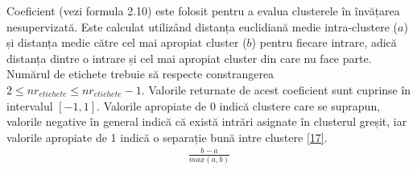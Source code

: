 Coeficient (vezi formula 2.10) este folosit pentru a evalua clusterele în învățarea nesupervizată. Este calculat utilizând distanța euclidiană medie intra-clustere ($a$) și distanța medie către cel mai apropiat cluster ($b$) pentru fiecare intrare, adică distanța dintre o intrare și cel mai apropiat cluster din care nu face parte. Numărul de etichete trebuie să respecte constrangerea $2 \leq nr_{etichete} \leq nr_{etichete} - 1$. Valorile returnate de acest coeficient sunt cuprinse în intervalul $[-1, 1]$. Valorile apropiate de 0 indică clustere care se suprapun, valorile negative în general indică că există intrări asignate în clusterul greșit, iar valorile apropiate de 1 indică o separație bună intre clustere \hyperlink{silhouette}{[17]}.
\begin{align}
	\frac{b-a}{max(a,b)}
\end{align}
